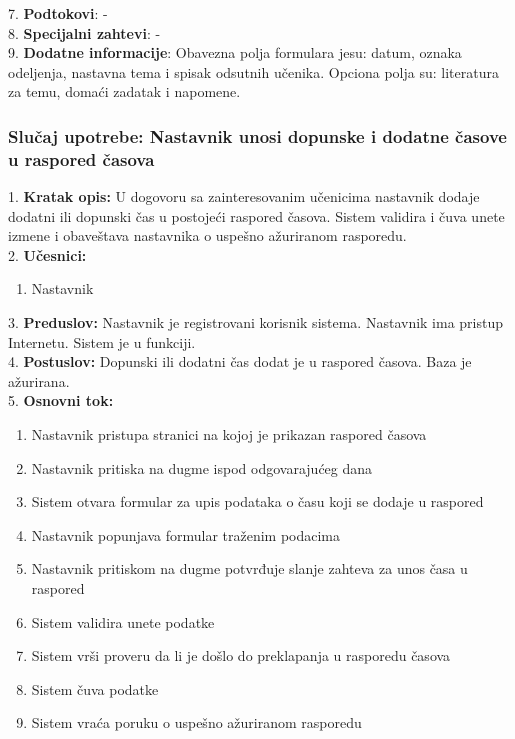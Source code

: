 \documentclass{article}
\begin{document}
7. \textbf{Podtokovi}: - \\

8. \textbf{Specijalni zahtevi}: - \\

9. \textbf{Dodatne informacije}: Obavezna polja formulara jesu: datum, oznaka odeljenja, nastavna tema i spisak odsutnih učenika. Opciona polja su: literatura za temu, domaći zadatak i napomene. \\


\subsubsection{Slučaj upotrebe: Nastavnik unosi dopunske i dodatne časove u raspored časova } 
1. \textbf{Kratak opis:} U dogovoru sa zainteresovanim učenicima nastavnik dodaje dodatni ili dopunski čas u postojeći raspored časova. Sistem validira i čuva unete izmene i obaveštava nastavnika o uspešno ažuriranom rasporedu. \\

2. \textbf{Učesnici:}
\begin{enumerate} [label=(\alph*)]
\item Nastavnik
\end{enumerate} 

3. \textbf{Preduslov:} Nastavnik je registrovani korisnik sistema. Nastavnik ima pristup Internetu. Sistem je u funkciji. \\

4. \textbf{Postuslov:} Dopunski ili dodatni čas dodat je u raspored časova. Baza je ažurirana. \\

5. \textbf{Osnovni tok:} 
\begin{enumerate} [label=(\alph*)]
\item Nastavnik pristupa stranici na kojoj je prikazan raspored časova
\item Nastavnik pritiska na dugme ispod odgovarajućeg dana  
\item Sistem otvara formular za upis podataka o času koji se dodaje u raspored
\item Nastavnik popunjava formular traženim podacima
\item Nastavnik pritiskom na dugme potvrđuje slanje zahteva za unos časa u raspored
\item Sistem validira unete podatke
\item Sistem vrši proveru da li je došlo do preklapanja u rasporedu časova
\item Sistem čuva podatke
\item Sistem vraća poruku o uspešno ažuriranom rasporedu
\end{enumerate}
\end{document}
